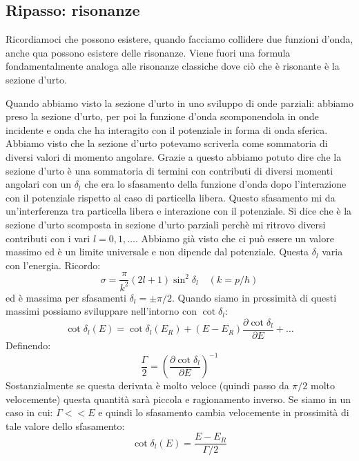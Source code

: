 \subsection{Ripasso: risonanze}
Ricordiamoci che possono esistere, quando facciamo collidere due funzioni d'onda, anche qua possono esistere delle risonanze. Viene fuori una formula fondamentalmente analoga alle risonanze classiche dove ciò che è risonante è la sezione d'urto.

Quando abbiamo visto la sezione d'urto in uno sviluppo di onde parziali: abbiamo preso la sezione d'urto, per poi la funzione d'onda scomponendola in onde incidente e onda che ha interagito con il potenziale in forma di onda sferica. Abbiamo visto che la sezione d'urto potevamo scriverla come sommatoria di diversi valori di momento angolare. Grazie a questo abbiamo potuto dire che la sezione d'urto è una sommatoria di termini con contributi di diversi momenti angolari con un $\delta_l$ che era lo sfasamento della funzione d'onda dopo l'interazione con il potenziale rispetto al caso di particella libera. Questo sfasamento mi da un'interferenza tra particella libera e interazione con il potenziale. Si dice che è la sezione d'urto scomposta in sezione d'urto parziali perchè mi ritrovo diversi contributi con i vari $l=0,1,\ldots$. Abbiamo già visto che ci può essere un valore massimo ed è un limite universale e non dipende dal potenziale. Questa $\delta_l$ varia con l'energia. Ricordo:
\begin{equation*}
    \sigma=\frac{\pi}{k^2}(2l+1)\sin^2{\delta_l} \quad (k=p/\hbar)
\end{equation*}
ed è massima per sfasamenti $\delta_l=\pm\pi/2$. Quando siamo in prossimità di questi massimi possiamo sviluppare nell'intorno con $\cot{\delta_l}$:
\begin{equation*}
    \cot{\delta_l}(E)=\cot{\delta_l}(E_R)+(E-E_R)\frac{\partial\cot{\delta_l}}{\partial E}+\ldots
\end{equation*}
Definendo:
\begin{equation*}
    \frac{\Gamma}{2}=\left(\frac{\partial\cot{\delta_l}}{\partial E}\right)^{-1}
\end{equation*}
Sostanzialmente se questa derivata è molto veloce (quindi passo da $\pi/2$ molto velocemente) questa quantità sarà piccola e ragionamento inverso. Se siamo in un caso in cui: $\Gamma<<E$ e quindi lo sfasamento cambia velocemente in prossimità di tale valore dello sfasamento:
\begin{equation*}
    \cot{\delta_l}(E)=\frac{E-E_R}{\Gamma/2}
\end{equation*}
